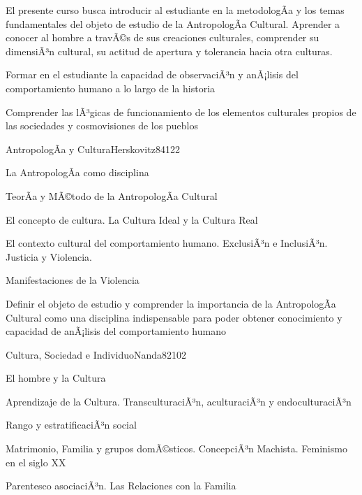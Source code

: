 \begin{syllabus}


\begin{justification}    
El presente curso busca introducir al estudiante en la metodologÃ­a y los temas fundamentales del 
objeto de estudio de la AntropologÃ­a Cultural. Aprender a conocer al hombre a travÃ©s de sus 
creaciones culturales, comprender su dimensiÃ³n cultural, su actitud de apertura y 
tolerancia hacia otra culturas.
\end{justification}

\begin{goals}
\item Formar en el estudiante la capacidad de observaciÃ³n y anÃ¡lisis del comportamiento humano a lo largo de la historia  
\item Comprender las lÃ³gicas de funcionamiento de los elementos culturales propios de las sociedades y cosmovisiones de los pueblos
\end{goals}

\begin{outcomes}
\end{outcomes}

\begin{unit}{AntropologÃ­a y Cultura}{Herskovitz84}{12}{2}
   \begin{topics}
      \item La AntropologÃ­a como disciplina
	\item TeorÃ­a y MÃ©todo de la AntropologÃ­a Cultural
	\item El concepto de cultura. La Cultura Ideal y la Cultura Real
	\item El contexto cultural del comportamiento humano. ExclusiÃ³n e InclusiÃ³n. Justicia y Violencia.
	\item Manifestaciones de la Violencia
   \end{topics}

   \begin{unitgoals}
      \item Definir el objeto de estudio y comprender la importancia de la AntropologÃ­a Cultural como una disciplina indispensable para poder obtener conocimiento y capacidad de anÃ¡lisis del comportamiento humano
   \end{unitgoals}
\end{unit}

\begin{unit}{Cultura, Sociedad e Individuo}{Nanda82}{10}{2}
   \begin{topics}
      \item El hombre y la Cultura
	\item Aprendizaje de la Cultura. TransculturaciÃ³n, aculturaciÃ³n y endoculturaciÃ³n
	\item Rango y estratificaciÃ³n social
	\item Matrimonio, Familia y grupos domÃ©sticos. ConcepciÃ³n Machista. Feminismo en el siglo XX
	\item Parentesco asociaciÃ³n. Las Relaciones con la Familia
   \end{topics}


\end{unit}
\end{syllabus}
